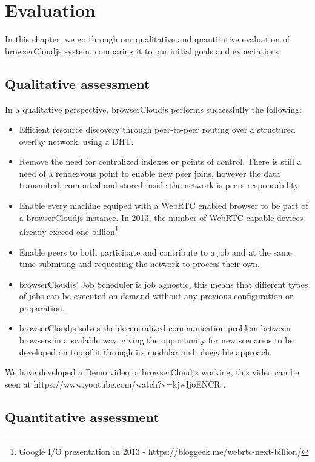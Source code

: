 
\section{Evaluation}

In this chapter, we go through our qualitative and quantitative evaluation of browserCloudjs system, comparing it to our initial goals and expectations.

\subsection{Qualitative assessment}

In a qualitative perspective, browserCloudjs performs successfully the following:

\begin{itemize}
    \item Efficient resource discovery through peer-to-peer routing over a structured overlay network, using a DHT.
    \item Remove the need for centralized indexes or points of control. There is still a need of a rendezvous point to enable new peer joins, however the data transmited, computed and stored inside the network is peers responsability.
    \item Enable every machine equiped with a WebRTC enabled browser to be part of a browserCloudjs instance. In 2013, the number of WebRTC capable devices already exceed one billion\footnote{Google I/O presentation in 2013 - https://bloggeek.me/webrtc-next-billion/}
    \item Enable peers to both participate and contribute to a job and at the same time submiting and requesting the network to process their own.
    \item browserCloudjs' Job Scheduler is job agnostic, this means that different types of jobs can be executed on demand without any previous configuration or preparation.
    \item browserCloudjs solves the decentralized communication problem between browsers in a scalable way, giving the opportunity for new scenarios to be developed on top of it through its modular and pluggable approach.
\end{itemize}

We have developed a Demo video of browserCloudjs working, this video can be seen at https://www.youtube.com/watch?v=kjwIjoENCR .

\subsection{Quantitative assessment}

